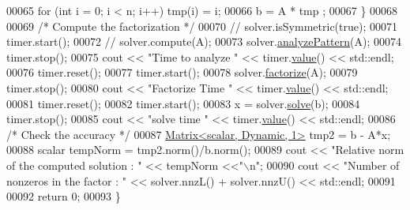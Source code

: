 \begin{DoxyCode}
00065     \textcolor{keywordflow}{for} (\textcolor{keywordtype}{int} i = 0; i < n; i++) tmp(i) = i; 
00066     b = A * tmp ;
00067   \}
00068 
00069   \textcolor{comment}{/* Compute the factorization */}
00070 \textcolor{comment}{//   solver.isSymmetric(true);}
00071   timer.start(); 
00072 \textcolor{comment}{//   solver.compute(A);}
00073   solver.\hyperlink{group___sparse_l_u___module_aa907ff958c4f4855145091d2686f3a8a}{analyzePattern}(A); 
00074   timer.stop(); 
00075   cout << \textcolor{stringliteral}{"Time to analyze "} << timer.\hyperlink{class_eigen_1_1_bench_timer_a26760f963ed8b64c126159bfea57735e}{value}() << std::endl;
00076   timer.reset(); 
00077   timer.start(); 
00078   solver.\hyperlink{group___sparse_l_u___module_a39858b0e72f2659d596364e252b34cbc}{factorize}(A); 
00079   timer.stop(); 
00080   cout << \textcolor{stringliteral}{"Factorize Time "} << timer.\hyperlink{class_eigen_1_1_bench_timer_a26760f963ed8b64c126159bfea57735e}{value}() << std::endl;
00081   timer.reset(); 
00082   timer.start(); 
00083   x = solver.\hyperlink{group___sparse_core___module_a4a66e9498b06e3ec4ec36f06b26d4e8f}{solve}(b);
00084   timer.stop();
00085   cout << \textcolor{stringliteral}{"solve time "} << timer.\hyperlink{class_eigen_1_1_bench_timer_a26760f963ed8b64c126159bfea57735e}{value}() << std::endl; 
00086   \textcolor{comment}{/* Check the accuracy */}
00087   \hyperlink{group___core___module_class_eigen_1_1_matrix}{Matrix<scalar, Dynamic, 1>} tmp2 = b - A*x;
00088   scalar tempNorm = tmp2.norm()/b.norm();
00089   cout << \textcolor{stringliteral}{"Relative norm of the computed solution : "} << tempNorm <<\textcolor{stringliteral}{"\(\backslash\)n"};
00090   cout << \textcolor{stringliteral}{"Number of nonzeros in the factor : "} << solver.nnzL() + solver.nnzU() << std::endl; 
00091   
00092   \textcolor{keywordflow}{return} 0;
00093 \}
\end{DoxyCode}
